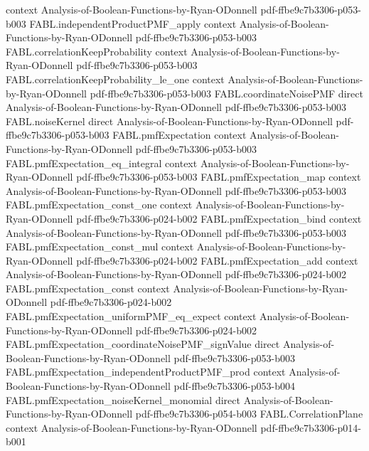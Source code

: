 \begin{theorem}
  {context}
  {Analysis-of-Boolean-Functions-by-Ryan-ODonnell}
  {pdf-ffbe9c7b3306-p053-b003}
\proofstep
  {FABL.independentProductPMF_apply}
  {context}
  {Analysis-of-Boolean-Functions-by-Ryan-ODonnell}
  {pdf-ffbe9c7b3306-p053-b003}
\proofstep
  {FABL.correlationKeepProbability}
  {context}
  {Analysis-of-Boolean-Functions-by-Ryan-ODonnell}
  {pdf-ffbe9c7b3306-p053-b003}
\proofstep
  {FABL.correlationKeepProbability_le_one}
  {context}
  {Analysis-of-Boolean-Functions-by-Ryan-ODonnell}
  {pdf-ffbe9c7b3306-p053-b003}
\proofstep
  {FABL.coordinateNoisePMF}
  {direct}
  {Analysis-of-Boolean-Functions-by-Ryan-ODonnell}
  {pdf-ffbe9c7b3306-p053-b003}
\proofstep
  {FABL.noiseKernel}
  {direct}
  {Analysis-of-Boolean-Functions-by-Ryan-ODonnell}
  {pdf-ffbe9c7b3306-p053-b003}
\proofstep
  {FABL.pmfExpectation}
  {context}
  {Analysis-of-Boolean-Functions-by-Ryan-ODonnell}
  {pdf-ffbe9c7b3306-p053-b003}
\proofstep
  {FABL.pmfExpectation_eq_integral}
  {context}
  {Analysis-of-Boolean-Functions-by-Ryan-ODonnell}
  {pdf-ffbe9c7b3306-p053-b003}
\proofstep
  {FABL.pmfExpectation_map}
  {context}
  {Analysis-of-Boolean-Functions-by-Ryan-ODonnell}
  {pdf-ffbe9c7b3306-p053-b003}
\proofstep
  {FABL.pmfExpectation_const_one}
  {context}
  {Analysis-of-Boolean-Functions-by-Ryan-ODonnell}
  {pdf-ffbe9c7b3306-p024-b002}
\proofstep
  {FABL.pmfExpectation_bind}
  {context}
  {Analysis-of-Boolean-Functions-by-Ryan-ODonnell}
  {pdf-ffbe9c7b3306-p053-b003}
\proofstep
  {FABL.pmfExpectation_const_mul}
  {context}
  {Analysis-of-Boolean-Functions-by-Ryan-ODonnell}
  {pdf-ffbe9c7b3306-p024-b002}
\proofstep
  {FABL.pmfExpectation_add}
  {context}
  {Analysis-of-Boolean-Functions-by-Ryan-ODonnell}
  {pdf-ffbe9c7b3306-p024-b002}
\proofstep
  {FABL.pmfExpectation_const}
  {context}
  {Analysis-of-Boolean-Functions-by-Ryan-ODonnell}
  {pdf-ffbe9c7b3306-p024-b002}
\proofstep
  {FABL.pmfExpectation_uniformPMF_eq_expect}
  {context}
  {Analysis-of-Boolean-Functions-by-Ryan-ODonnell}
  {pdf-ffbe9c7b3306-p024-b002}
\proofstep
  {FABL.pmfExpectation_coordinateNoisePMF_signValue}
  {direct}
  {Analysis-of-Boolean-Functions-by-Ryan-ODonnell}
  {pdf-ffbe9c7b3306-p053-b003}
\proofstep
  {FABL.pmfExpectation_independentProductPMF_prod}
  {context}
  {Analysis-of-Boolean-Functions-by-Ryan-ODonnell}
  {pdf-ffbe9c7b3306-p053-b004}
\proofstep
  {FABL.pmfExpectation_noiseKernel_monomial}
  {direct}
  {Analysis-of-Boolean-Functions-by-Ryan-ODonnell}
  {pdf-ffbe9c7b3306-p054-b003}
\proofstep
  {FABL.CorrelationPlane}
  {context}
  {Analysis-of-Boolean-Functions-by-Ryan-ODonnell}
  {pdf-ffbe9c7b3306-p014-b001}

\end{theorem}
